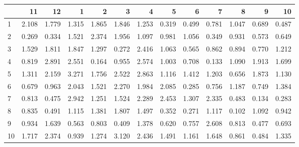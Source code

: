 \begin{tabular}{lrrrrrrrrrrrr}
\toprule
{} &     11 &     12 &     1  &     2  &     3  &     4  &     5  &     6  &     7  &     8  &     9  &     10 \\
\midrule
1  &  2.108 &  1.779 &  1.315 &  1.865 &  1.846 &  1.253 &  0.319 &  0.499 &  0.781 &  1.047 &  0.689 &  0.487 \\
2  &  0.269 &  0.334 &  1.521 &  2.374 &  1.956 &  1.097 &  0.981 &  1.056 &  0.349 &  0.931 &  0.573 &  0.649 \\
3  &  1.529 &  1.811 &  1.847 &  1.297 &  0.272 &  2.416 &  1.063 &  0.565 &  0.862 &  0.894 &  0.770 &  1.212 \\
4  &  0.819 &  2.891 &  2.551 &  0.164 &  0.955 &  2.574 &  1.003 &  0.708 &  0.133 &  1.090 &  1.913 &  1.699 \\
5  &  1.311 &  2.159 &  3.271 &  1.756 &  2.522 &  2.863 &  1.116 &  1.412 &  1.203 &  0.656 &  1.873 &  1.130 \\
6  &  0.679 &  0.963 &  2.043 &  1.521 &  2.270 &  1.984 &  2.085 &  0.285 &  0.756 &  1.187 &  0.749 &  1.384 \\
7  &  0.813 &  0.475 &  2.942 &  1.251 &  1.524 &  2.289 &  2.453 &  1.307 &  2.335 &  0.483 &  0.134 &  0.283 \\
8  &  0.835 &  0.491 &  1.115 &  1.381 &  1.807 &  1.497 &  0.352 &  0.271 &  1.117 &  0.102 &  1.092 &  0.942 \\
9  &  0.934 &  1.639 &  0.563 &  0.803 &  0.409 &  1.378 &  0.620 &  0.757 &  2.608 &  0.813 &  0.477 &  0.693 \\
10 &  1.717 &  2.374 &  0.939 &  1.274 &  3.120 &  2.436 &  1.491 &  1.161 &  1.648 &  0.861 &  0.484 &  1.335 \\
\bottomrule
\end{tabular}
